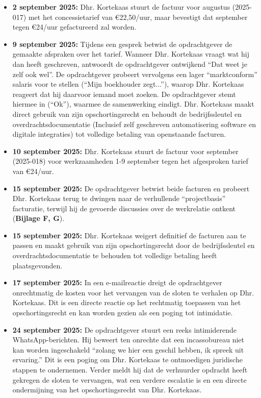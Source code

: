 \documentclass[10pt,a4paper]{article}
\begin{document}
\begin{adjustwidth}{15mm}{15mm}
\begin{itemize}
\item \textbf{2 september 2025:} Dhr. Kortekaas stuurt de factuur voor augustus (2025-017) met het concessietarief van €22,50/uur, maar bevestigt dat september tegen €24/uur gefactureerd zal worden.
\item \textbf{9 september 2025:} Tijdens een gesprek betwist de opdrachtgever de gemaakte afspraken over het tarief. Wanneer Dhr. Kortekaas vraagt wat hij dan heeft geschreven, antwoordt de opdrachtgever ontwijkend ``Dat weet je zelf ook wel''. De opdrachtgever probeert vervolgens een lager ``marktconform'' salaris voor te stellen (``Mijn boekhouder zegt...''), waarop Dhr. Kortekaas reageert dat hij daarvoor iemand moet zoeken. De opdrachtgever stemt hiermee in (``Ok''), waarmee de samenwerking eindigt. Dhr. Kortekaas maakt direct gebruik van zijn opschortingsrecht en behoudt de bedrijfssleutel en overdrachtsdocumentatie (Inclusief zelf geschreven automatisering software en digitale integraties) tot volledige betaling van openstaande facturen.
\item \textbf{10 september 2025:} Dhr. Kortekaas stuurt de factuur voor september (2025-018) voor werkzaamheden 1-9 september tegen het afgesproken tarief van €24/uur.
\item \textbf{15 september 2025:} De opdrachtgever betwist beide facturen en probeert Dhr. Kortekaas terug te dwingen naar de verhullende ``projectbasis'' facturatie, terwijl hij de gevoerde discussies over de werkrelatie ontkent (\textbf{Bijlage F, G}).
\item \textbf{15 september 2025:} Dhr. Kortekaas weigert definitief de facturen aan te passen en maakt gebruik van zijn opschortingsrecht door de bedrijfssleutel en overdrachtsdocumentatie te behouden tot volledige betaling heeft plaatsgevonden.
\item \textbf{17 september 2025:} In een e-mailreactie dreigt de opdrachtgever onrechtmatig de kosten voor het vervangen van de sloten te verhalen op Dhr. Kortekaas. Dit is een directe reactie op het rechtmatig toepassen van het opschortingsrecht en kan worden gezien als een poging tot intimidatie.
\item \textbf{24 september 2025:} De opdrachtgever stuurt een reeks intimiderende WhatsApp-berichten. Hij beweert ten onrechte dat een incassobureau niet kan worden ingeschakeld ``zolang we hier een geschil hebben, ik spreek uit ervaring.'' Dit is een poging om Dhr. Kortekaas te ontmoedigen juridische stappen te ondernemen. Verder meldt hij dat de verhuurder opdracht heeft gekregen de sloten te vervangen, wat een verdere escalatie is en een directe ondermijning van het opschortingsrecht van Dhr. Kortekaas.
\end{itemize}


\end{adjustwidth}
\end{document}
